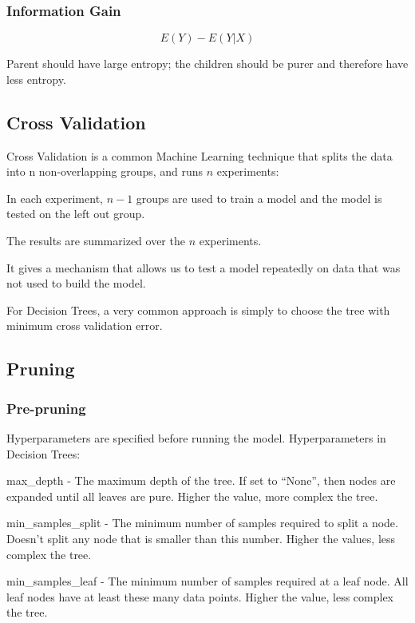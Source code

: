 	\subsubsection{Information Gain}
	\begin{equation}
		E(Y) - E(Y|X)
	\end{equation}
	\begin{mathwhere}[0.4in]
	\end{mathwhere}
Parent should have large entropy; the children should be purer and therefore have less entropy.

	\subsection{Cross Validation}
Cross Validation is a common Machine Learning technique that splits the data into n non-overlapping groups, and runs $n$ experiments:
	\begin{bulletedlist}
		\item In each experiment, $n-1$ groups are used to train a model and the model is tested on the left out group.
		\item The results are summarized over the $n$ experiments.
		\item It gives a mechanism that allows us to test a model repeatedly on data that was not used to build the model.
		\item For Decision Trees, a very common approach is simply to choose the tree with minimum cross validation error.
	\end{bulletedlist}

	\subsection{Pruning}
	\subsubsection{Pre-pruning}
Hyperparameters are specified before running the model.  Hyperparameters in Decision Trees:
	\begin{bulletedlist}
		\item max\_depth - The maximum depth of the tree. If set to ``None'', then nodes are expanded until all leaves are pure. Higher the value, more complex the tree.
		\item min\_samples\_split - The minimum number of samples required to split a node. Doesn't split any node that is smaller than this number. Higher the values, less complex the tree.
		\item min\_samples\_leaf - The minimum number of samples required at a leaf node. All leaf nodes have at least these many data points. Higher the value, less complex the tree.
	\end{bulletedlist}

